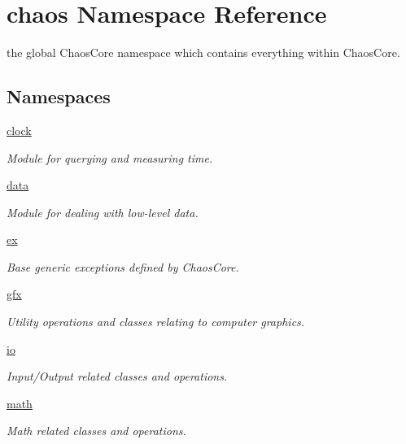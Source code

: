 \hypertarget{namespacechaos}{}\section{chaos Namespace Reference}
\label{namespacechaos}


the global Chaos\+Core namespace which contains everything within Chaos\+Core.  


\subsection*{Namespaces}
\begin{DoxyCompactItemize}
\item 
 \hyperlink{namespacechaos_1_1clock}{clock}
\begin{DoxyCompactList}\small\item\em Module for querying and measuring time. \end{DoxyCompactList}\item 
 \hyperlink{namespacechaos_1_1data}{data}
\begin{DoxyCompactList}\small\item\em Module for dealing with low-\/level data. \end{DoxyCompactList}\item 
 \hyperlink{namespacechaos_1_1ex}{ex}
\begin{DoxyCompactList}\small\item\em Base generic exceptions defined by Chaos\+Core. \end{DoxyCompactList}\item 
 \hyperlink{namespacechaos_1_1gfx}{gfx}
\begin{DoxyCompactList}\small\item\em Utility operations and classes relating to computer graphics. \end{DoxyCompactList}\item 
 \hyperlink{namespacechaos_1_1io}{io}
\begin{DoxyCompactList}\small\item\em Input/\+Output related classes and operations. \end{DoxyCompactList}\item 
 \hyperlink{namespacechaos_1_1math}{math}
\begin{DoxyCompactList}\small\item\em Math related classes and operations. \end{DoxyCompactList}\item 

\end{DoxyCompactItemize}
